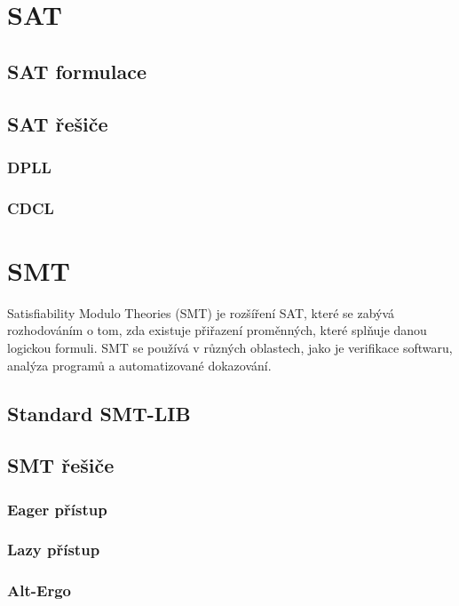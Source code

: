 
\section{SAT}

\subsection{SAT formulace}
\subsection{SAT řešiče}
\subsubsection{DPLL}
\subsubsection{CDCL}

\section{SMT}

Satisfiability Modulo Theories (SMT) je rozšíření SAT, které se zabývá rozhodováním o tom,
zda existuje přiřazení proměnných, které splňuje danou logickou formuli.
SMT se používá v různých oblastech, jako je verifikace softwaru, analýza programů a automatizované dokazování.



\subsection{Standard SMT-LIB}
\subsection{SMT řešiče}
\subsubsection{Eager přístup}
\subsubsection{Lazy přístup}
\subsubsection{Alt-Ergo}
